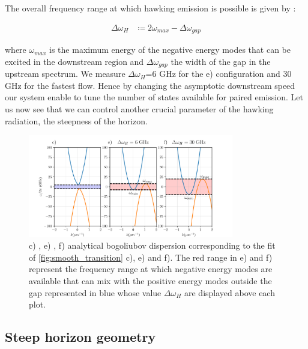 The overall frequency range at which hawking emission is possible is given by :

\begin{equation}
    \begin{align}
    \Delta \omega_H& \coloneqq  2\omega_{max}- \Delta\omega_{gap}
    \end{align}  
    \label{eq:hawking_range}
\end{equation}

where $\omega_{max}$ is the maximum energy of the negative energy modes that can be excited in the downstream region and $\Delta\omega_{gap}$ the width 
of the gap in the upstream spectrum. We measure $\Delta \omega_H$=6 GHz for the e) configuration and 30 GHz for the fastest flow. 
Hence by changing the asymptotic downstream speed our system enable to tune the number of states available for paired emission. Let us now 
see that we can control another crucial parameter of the hawking radiation, the steepness of the horizon.

\begin{figure}
    \centering
    \includegraphics[width=0.8\textwidth]{chap_custom_st/fig/max_freq_hawking.pdf}
    \caption{c) , e) , f) analytical bogoliubov dispersion corresponding to the fit of \autoref{fig:smooth_transition} c), e) and f). The red range in e) and f) represent the frequency range at which negative energy modes
    are available that can mix with the positive energy modes outside the gap represented in blue whose value $\Delta \omega_H$ are displayed above each plot.}
    \label{fig:hawking_range}
\end{figure}

\subsection{Steep horizon geometry}


